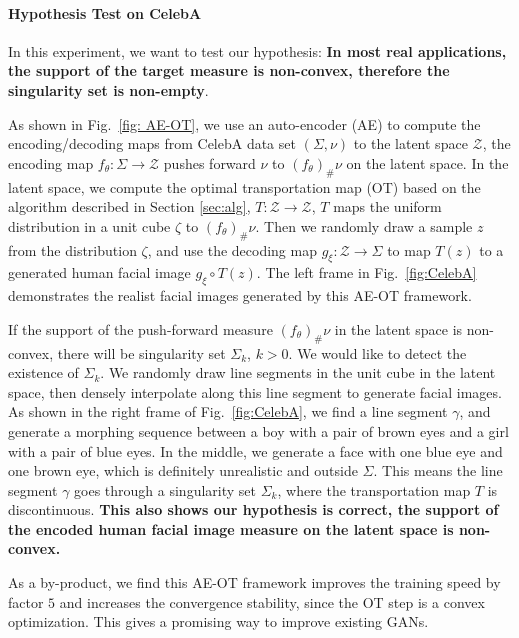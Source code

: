 \documentclass{article}
\begin{document}
\paragraph{Hypothesis Test on CelebA} In this experiment, we want to test our hypothesis: \textbf{In most real applications, the support of the target measure is non-convex, therefore the singularity set is non-empty}.

As shown in Fig.~\ref{fig: AE-OT}, we use an auto-encoder (AE) to compute the encoding/decoding maps from CelebA data set $(\Sigma,\nu)$ to the latent space $\mathcal{Z}$, the encoding map $f_\theta: \Sigma\to \mathcal{Z}$ pushes forward $\nu$ to $(f_\theta)_\# \nu$ on the latent space. In the latent space, we compute the optimal transportation map (OT) based on the algorithm described in Section \ref{sec:alg}, $T: \mathcal{Z}\to\mathcal{Z}$, $T$ maps the uniform distribution in a unit cube $\zeta$ to $(f_\theta)_\# \nu$. Then we randomly draw a sample $z$ from the distribution $\zeta$, and use the decoding map $g_\xi: \mathcal{Z}\to \Sigma$ to map $T(z)$ to a generated human facial image $g_\xi\circ T(z)$. The left frame in Fig.~\ref{fig:CelebA} demonstrates the realist facial images generated by this AE-OT framework.

If the support of the push-forward measure $(f_\theta)_\# \nu$ in the latent space is non-convex, there will be singularity set $\Sigma_k$, $k>0$. We would like to detect the existence of $\Sigma_k$. We randomly draw line segments in the unit cube in the latent space, then densely interpolate along this line segment to generate facial images. As shown in the right frame of Fig.~\ref{fig:CelebA}, we find a line segment $\gamma$, and generate a morphing sequence between a boy with a pair of brown eyes and a girl with a pair of blue eyes. In the middle, we generate a face with one blue eye and one brown eye, which is definitely unrealistic and outside $\Sigma$. This means the line segment $\gamma$ goes through a singularity set $\Sigma_k$, where the transportation map $T$ is discontinuous. \textbf{This also shows our hypothesis is correct, the support of the encoded human facial image measure on the latent space is non-convex. }


As a by-product, we find this AE-OT framework improves the training speed by factor $5$ and increases the convergence stability, since the OT step is a convex optimization. This gives a promising way to improve existing GANs.
\end{document}
